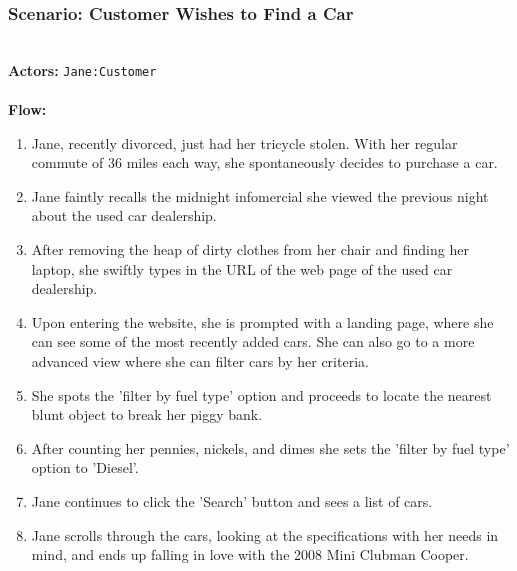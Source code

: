 \subsubsection{Scenario: Customer Wishes to Find a Car}
\label{sec:scenario-findcar}
\HRule \\[0.4cm]
\textbf{Actors:} \texttt{Jane:Customer}\\
\HRule \\[0.4cm]
\textbf{Flow:} \\
\begin{enumerate}
 \item Jane, recently divorced, just had her tricycle stolen. With her regular commute of 36 miles each way, she spontaneously decides to purchase a car.
 \item Jane faintly recalls the midnight infomercial she viewed the previous night about the used car dealership.
 \item After removing the heap of dirty clothes from her chair and finding her laptop, she swiftly types in the URL of the web page of the used car dealership.
 \item Upon entering the website, she is prompted with a landing page, where she can see some of the most recently added cars. She can also go to a more advanced view where she can filter cars by her criteria.
 \item She spots the 'filter by fuel type' option and proceeds to locate the nearest blunt object to break her piggy bank.
 \item After counting her pennies, nickels, and dimes she sets the 'filter by fuel type' option to 'Diesel'.
 \item Jane continues to click the 'Search' button and sees a list of cars.
 \item Jane scrolls through the cars, looking at the specifications with her needs in mind, and ends up falling in love with the 2008 Mini Clubman Cooper.
\end{enumerate}
\HRule \\[0.4cm]
